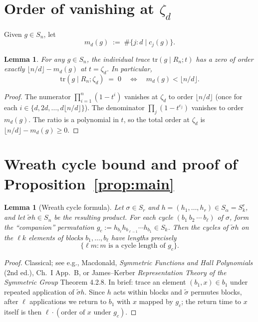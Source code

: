 \documentclass[11pt]{article}
\newtheorem{lemma}[theorem]{Lemma}
\theoremstyle{definition}
\theoremstyle{remark}
\begin{document}
\section{Order of vanishing at $\zeta_d$}

Given $g \in S_n$, let
\[
m_d(g) \;:=\; \#\{j : d \mid c_j(g)\}.
\]

\begin{lemma}\label{lem:order}
For any $g \in S_n$, the individual trace
$\text{tr}(g \mid R_n; t)$ has a zero of order exactly
$\lfloor n/d \rfloor - m_d(g)$ at $t = \zeta_d$.  In particular,
\[
\text{tr}(g \mid R_n; \zeta_d) \;=\; 0
\quad \iff \quad m_d(g) < \lfloor n/d \rfloor.
\]
\end{lemma}

\begin{proof}
The numerator $\prod_{i=1}^{n}(1 - t^i)$ vanishes at $\zeta_d$ to order
$\lfloor n/d \rfloor$ (once for each $i \in \{d, 2d, \ldots, d\lfloor n/d\rfloor\}$).
The denominator $\prod_j (1 - t^{c_j})$ vanishes to order $m_d(g)$.
The ratio is a polynomial in $t$, so the total order at $\zeta_d$ is
$\lfloor n/d\rfloor - m_d(g) \ge 0$.
\end{proof}

\section{Wreath cycle bound and proof of Proposition~\ref{prop:main}}

\begin{lemma}[Wreath cycle formula]\label{lem:wreath-cycles}
Let $\sigma \in S_r$ and $h = (h_1, \ldots, h_r) \in S_\alpha = S_k^r$,
and let $\tilde\sigma h \in S_n$ be the resulting product.  For each
cycle $(b_1\ b_2\ \cdots\ b_\ell)$ of $\sigma$, form the ``companion''
permutation $g_c := h_{b_\ell} h_{b_{\ell-1}} \cdots h_{b_1} \in S_k$.
Then the cycles of $\tilde\sigma h$ on the $\ell k$ elements of blocks
$b_1, \ldots, b_\ell$ have lengths precisely
\[
\{\ell m : m \text{ is a cycle length of } g_c\}.
\]
\end{lemma}

\begin{proof}
Classical; see e.g., Macdonald, \emph{Symmetric Functions and Hall
Polynomials} (2nd ed.), Ch.~I App.~B, or James--Kerber
\emph{Representation Theory of the Symmetric Group} Theorem 4.2.8. In
brief: trace an element $(b_1, x) \in b_1$ under repeated application of
$\tilde\sigma h$. Since $h$ acts within blocks and $\tilde\sigma$
permutes blocks, after $\ell$ applications we return to $b_1$ with
$x$ mapped by $g_c$; the return time to $x$ itself is then
$\ell \cdot (\text{order of } x \text{ under } g_c)$.
\end{proof}
\end{document}
